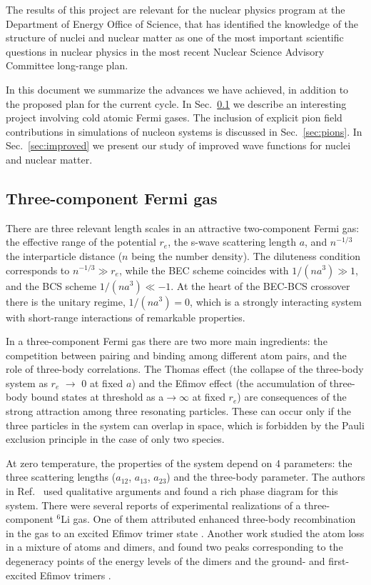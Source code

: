 \documentclass[12pt,letterpaper]{article}
\begin{document}
The results of this project are relevant for the nuclear physics program at 
the Department of Energy Office of Science, that has identified the 
knowledge of the structure of nuclei and nuclear matter as one of the most 
important scientific questions in nuclear physics in the most recent Nuclear 
Science Advisory Committee long-range plan.

In this document we summarize the advances we have achieved, in addition 
to the proposed plan for the current cycle.
In Sec.~\ref{sec:cold} we describe an interesting project involving
cold atomic Fermi gases.
The inclusion of explicit pion field contributions in simulations of nucleon 
systems is discussed in Sec.~\ref{sec:pions}.
In Sec.~\ref{sec:improved} we present our study of improved wave functions for 
nuclei and nuclear matter.

\subsection{Three-component Fermi gas}
\label{sec:cold}

There are three relevant length scales in an attractive two-component Fermi gas: the effective range of
the potential $r_e$, the s-wave scattering length $a$, and $n^{-1/3}$ the
interparticle distance ($n$ being the number density). The diluteness condition
corresponds to $n^{-1/3} \gg r_e$, while the BEC scheme coincides with
$1/(na^3)\gg 1$, and the BCS scheme $1/(na^3)\ll -1$.
At the heart of the
BEC-BCS crossover there is the unitary regime, $1/(na^3)=0$, which
is a strongly
interacting system with short-range interactions of remarkable
properties.  

In a three-component Fermi gas there are two more main ingredients: the competition between pairing and binding among different atom pairs, and
the role of three-body correlations.
The Thomas
effect (the collapse of the three-body system as $r_e$ $\to$ 0 at fixed $a$) and the Efimov effect (the
accumulation of three-body bound states at threshold as a$\to\infty$ at fixed $r_e$) are consequences of the
strong attraction among three resonating particles. These can occur
only if the three particles in the system can overlap in space, which is forbidden by the Pauli exclusion principle in the case of only two species.

At zero temperature, the properties of
the system depend on 4 parameters: the three scattering lengths ($a_{12}$, $a_{13}$, $a_{23}$) and the three-body parameter. The authors in
Ref.~\cite{bed09} used qualitative arguments and found a rich phase diagram
for this system.
There were several reports of experimental realizations of a three-component
$^6$Li gas. One of them attributed 
enhanced three-body recombination in the gas to an excited Efimov trimer state
\cite{wil09}.
Another work studied the atom loss in a
mixture of atoms and dimers, and found two peaks corresponding to the degeneracy points of the energy levels of the dimers and the ground- and first-excited Efimov trimers \cite{nak10}.
\end{document}
